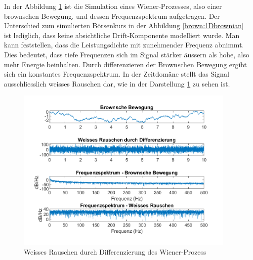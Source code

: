 In der Abbildung \ref{brown:diffWienerFFT} ist die Simulation eines Wiener-Prozesses, also einer brownschen Bewegung, und dessen Frequenzspektrum aufgetragen. Der Unterschied zum simulierten Börsenkurs in der Abbildung \ref{brown:1Dbrownian} ist lediglich, dass keine absichtliche Drift-Komponente modelliert wurde. Man kann feststellen, dass die Leistungsdichte mit zunehmender Frequenz abnimmt. Dies bedeutet, dass tiefe Frequenzen sich im Signal stärker äussern als hohe, also mehr Energie beinhalten. Durch differenzieren der Brownschen Bewegung ergibt sich ein konstantes Frequenzspektrum. In der Zeitdomäne stellt das Signal ausschliesslich weisses Rauschen dar, wie in der Darstellung \ref{brown:diffWienerFFT} zu sehen ist.


\begin{figure}
	\centering
	\includegraphics[width=0.95\textwidth]{papers/brown/images/weissesRauscheDurchBrown-timeDomain.png}
	\caption{Weisses Rauschen durch Differenzierung des Wiener-Prozess}
	\label{brown:diffWienerFFT}
\end{figure}


